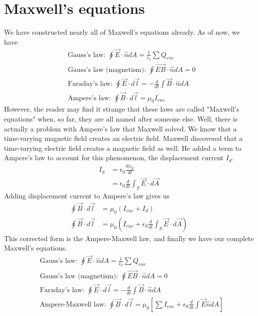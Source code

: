 \documentclass[nobib]{tufte-handout}
\begin{document}
\section{Maxwell's equations}
We have constructed nearly all of Maxwell's equations 
already. As of now, we have 
\begin{align*}
    &\text{Gauss's law: } \oint \vec{E} \cdot \hat{n} dA = \frac{1}{\epsilon_0} \sum Q_{enc} \\
    &\text{Gauss's law (magnetism): } \oint \vec{EB} \cdot \hat{n} dA = 0 \\
    &\text{Faraday's law: } \oint \vec{E} \cdot d\vec{l} = -\frac{d}{dt} \int \vec{B} \cdot \hat{n} dA \\
    &\text{Ampere's law: } \oint \vec{B} \cdot d\vec{l} = \mu_0 I_{enc}
\end{align*}
However, the reader may find it strange that 
these laws are called "Maxwell's equations" when, 
so far, they are all named after someone else. 
Well, there is actually a problem with 
Ampere's law that Maxwell solved. We know that 
a time-varying magnetic field creates an electric field. 
Maxwell discovered that a time-varying electric field 
creates a magnetic field as well. He added a term 
to Ampere's law to account for this phenomenon, 
the displacement current $I_d$. 
\begin{align*}
    I_d &= \epsilon_0 \frac{d\phi_E}{dt} \\
    &= \epsilon_0 \frac{d}{dt}\int_S \vec{E} \cdot d\vec{A} 
\end{align*}
Adding displacement current to Ampere's law gives us 
\begin{align*}
    \oint \vec{B} \cdot d\vec{l} &= \mu_0 (I_{enc} + I_d) \\
    \oint \vec{B} \cdot d\vec{l} &= \mu_0 (I_{enc} + \epsilon_0 \frac{d}{dt}\int_S \vec{E} \cdot d\vec{A})
\end{align*}
This corrected form is the Ampere-Maxwell law, 
and finally we have our complete Maxwell's equations. 
\begin{align*}
    &\text{Gauss's law: } \oint \vec{E} \cdot \hat{n} dA = \frac{1}{\epsilon_0} \sum Q_{enc} \\
    &\text{Gauss's law (magnetism): } \oint \vec{EB} \cdot \hat{n} dA = 0 \\
    &\text{Faraday's law: } \oint \vec{E} \cdot d\vec{l} = -\frac{d}{dt} \int \vec{B} \cdot \hat{n} dA \\
    &\text{Ampere-Maxwell law: } \oint \vec{B} \cdot d\vec{l} = \mu_0 \left[\sum I_{enc} + \epsilon_0 \frac{d}{dt} \int \vec{E} \hat{n}dA\right]
\end{align*}
\end{document}
